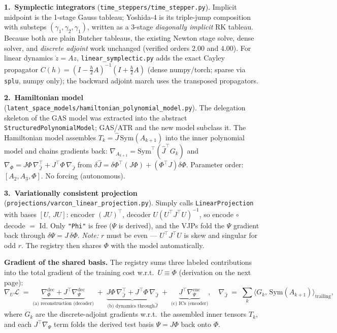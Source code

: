 \documentclass[10pt]{article}
\newcommand{\code}[1]{\colorbox{codegray}{\small\texttt{#1}}}
\newcommand{\Jhat}{\hat{J}}
\begin{document}
\textbf{1.\ Symplectic integrators}\;
(\code{time\_steppers/time\_stepper.py}).\;
Implicit midpoint is the 1-stage Gauss tableau; Yoshida-4 is its triple-jump
composition with substeps $(\gamma_1, \gamma_2, \gamma_1)$, written as a
3-stage \emph{diagonally implicit} RK tableau. Because both are plain Butcher
tableaus, the existing Newton stage solve, dense solver, and \emph{discrete
adjoint} work unchanged (verified orders $2.00$ and $4.00$). For linear
dynamics $\dot z = A z$, \code{linear\_symplectic.py} adds the exact Cayley
propagator $C(h) = (I - \tfrac h2 A)^{-1}(I + \tfrac h2 A)$ (dense
numpy/torch; sparse via \code{splu}, numpy only); the backward adjoint march
uses the transposed propagators.

\textbf{2.\ Hamiltonian model}\;
(\code{latent\_space\_models/hamiltonian\_polynomial\_model.py}).\;
The delegation skeleton of the GAS model was extracted into the abstract
\code{StructuredPolynomialModel}; GAS/ATR and the new model subclass it.
The Hamiltonian model assembles $T_k = \Jhat\,\mathrm{Sym}(A_{k+1})$
into the inner polynomial model and chains gradients back:
$\nabla_{A_{k+1}} = \mathrm{Sym}^\top(\Jhat^\top G_k)$ and
$\nabla_\Phi = J\Phi\, \nabla_{\Jhat}^{\top} + J^\top\!\Phi\, \nabla_{\Jhat}$
from $\delta\Jhat = \delta\Phi^\top(J\Phi) + (\Phi^\top J)\delta\Phi$.
Parameter order: $[A_2, A_3, \Phi]$. No forcing (autonomous).

\textbf{3.\ Variationally consistent projection}\;
(\code{projections/varcon\_linear\_projection.py}).\;
Simply calls \code{LinearProjection} with bases $[U,\, JU]$: encoder $(JU)^\top$, decoder
$U (U^\top J^\top U)^{-1}$, so encode$\,\circ\,$decode $=$ Id. Only
\code{"Phi"} is free ($\Psi$ is derived), and the VJPs fold the $\Psi$
gradient back through $\delta\Psi = J\,\delta\Phi$. \emph{Note:} $r$ must be
even --- $U^\top J^\top U$ is skew and singular for odd $r$. The registry
then shares $\Phi$ with the model automatically.

\textbf{Gradient of the shared basis.}\;
The registry sums three labeled contributions into the total gradient of the
training cost w.r.t.\ $U \equiv \Phi$ (derivation on the next page):
\begin{equation*}
    \nabla_U \mathcal{L}
    \;=\;
    \underbrace{\nabla^{\mathrm{dec}}_{\Phi}
        + J^\top \nabla^{\mathrm{dec}}_{\Psi}}_{\text{(a) reconstruction (decoder)}}
    \;+\;
    \underbrace{J\Phi\, \nabla_{\Jhat}^{\top}
        + J^\top \Phi\, \nabla_{\Jhat}}_{\text{(b) dynamics through} \Jhat}
    \;+\;
    \underbrace{J^\top \nabla^{\mathrm{enc}}_{\Psi}}_{\text{(c) ICs (encoder)}},
    \quad
    \nabla_{\Jhat} \;=\; \sum_k \bigl\langle G_k,\,
        \mathrm{Sym}(A_{k+1}) \bigr\rangle_{\text{trailing}},
\end{equation*}
where $G_k$ are the discrete-adjoint gradients w.r.t.\ the assembled inner
tensors $T_k$, and each $J^\top \nabla_\Psi$ term folds the derived test
basis $\Psi = J\Phi$ back onto $\Phi$.
\end{document}
